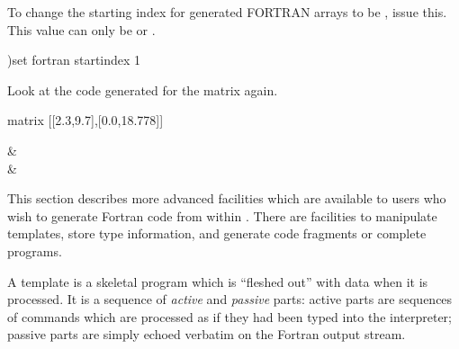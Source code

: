\begin{noOutputXtc}
\begin{xtccomment}
To change the starting index for generated FORTRAN arrays to be ,
issue this.
This value can only be  or .
\end{xtccomment}
\begin{spadsrc}
)set fortran startindex 1 
\end{spadsrc}
\end{noOutputXtc}
\begin{xtc}
\begin{xtccomment}
Look at the code generated for the matrix again.
\end{xtccomment}
\begin{spadsrc}
matrix [[2.3,9.7],[0.0,18.778]] 
\end{spadsrc}
\begin{TeXOutput}
\begin{fricasmath}{12}
\begin{MATRIX}{2}&\\&%
\end{MATRIX}%
\end{fricasmath}
\end{TeXOutput}
\end{xtc}


This section describes more advanced facilities which are available to users
who wish to generate Fortran code from within \Language{}.  There are
facilities to manipulate templates, store type information, and generate
code fragments or complete programs.


A template is a skeletal program which is ``fleshed out'' with data when
it is processed.  It is a sequence of {\em active} and {\em passive} parts:
active parts are sequences of \Language{} commands which are processed as if they
had been typed into the interpreter; passive parts are simply echoed
verbatim on the Fortran output stream.

